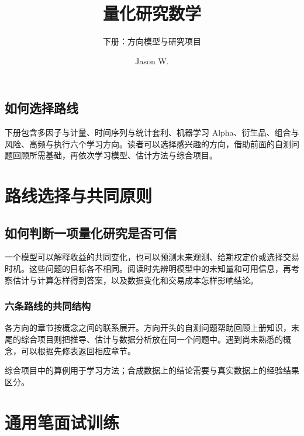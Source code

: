 \documentclass[lang=cn,11pt,scheme=chinese]{elegantbook}
\title{量化研究数学}
\subtitle{下册：方向模型与研究项目}
\author{Jason W.}
\date{\MFQReleaseDate}
\begin{document}
\maketitle
\frontmatter

\chapter*{如何选择路线}
下册包含多因子与计量、时间序列与统计套利、机器学习 Alpha、衍生品、组合与风险、高频与执行六个学习方向。读者可以选择感兴趣的方向，借助前面的自测问题回顾所需基础，再依次学习模型、估计方法与综合项目。



\tableofcontents

\part*{路线选择与共同原则}
\setcounter{secnumdepth}{-1}

\chapter{如何判断一项量化研究是否可信}

一个模型可以解释收益的共同变化，也可以预测未来观测、给期权定价或选择交易时机。这些问题的目标各不相同。阅读时先辨明模型中的未知量和可用信息，再考察估计与计算怎样得到答案，以及数据变化和交易成本怎样影响结论。

\section{六条路线的共同结构}

各方向的章节按概念之间的联系展开。方向开头的自测问题帮助回顾上册知识，末尾的综合项目则把推导、估计与数据分析放在同一个问题中。遇到尚未熟悉的概念，可以根据先修表返回相应章节。

\begin{note}
综合项目中的算例用于学习方法；合成数据上的结论需要与真实数据上的经验结果区分。
\end{note}




\mainmatter
\setcounter{secnumdepth}{1}
\part{通用笔面试训练}

\end{document}
